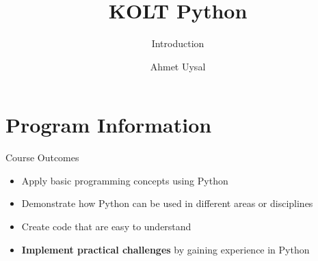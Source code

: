 

\usepackage{../KU-Beamer-Template/style/koc} 
\usepackage{minted}
\usepackage{upquote}
 
\title{KOLT Python} 
\subtitle{Introduction} 
\date{}
\author{Ahmet Uysal}




  \maketitle


	\section{Program Information}

	\begin{frame}{Course Outcomes}
		\LARGE
		\begin{itemize}
			\item Apply basic programming concepts using Python
			\pause
			\item Demonstrate how Python can be used in different areas or disciplines
			\pause
			\item Create code that are easy to understand
			\pause
			\item \textbf{Implement practical challenges} by gaining experience in Python
		\end{itemize}
	\end{frame}

